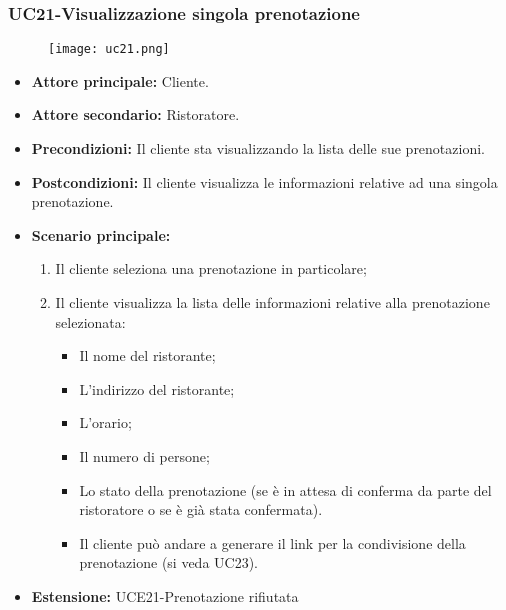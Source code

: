 \subsubsection{UC21-Visualizzazione singola prenotazione} %
\begin{figure}[h] \texttt{[image: uc21.png]} \end{figure}
\begin{itemize}
    \item \textbf{Attore principale: } Cliente.
    \item \textbf{Attore secondario: } Ristoratore.
    \item \textbf{Precondizioni: }Il cliente sta visualizzando la lista delle sue prenotazioni.
    \item \textbf{Postcondizioni: }Il cliente visualizza le informazioni relative ad una singola prenotazione.
    \item \textbf{Scenario principale:}
        \begin{enumerate}
            \item Il cliente seleziona una prenotazione in particolare;
            \item Il cliente visualizza la lista delle informazioni relative alla prenotazione selezionata:
            \begin{itemize}
                \item Il nome del ristorante;
                \item L'indirizzo del ristorante;
                \item L'orario;
                \item Il numero di persone;
                \item Lo stato della prenotazione (se è in attesa di conferma da parte del ristoratore
                o se è già stata confermata).
            \item Il cliente può andare a generare il link per la condivisione della prenotazione (si veda UC23).
            \end{itemize}
        \end{enumerate}
    \item \textbf{Estensione: }UCE21-Prenotazione rifiutata
\end{itemize}

